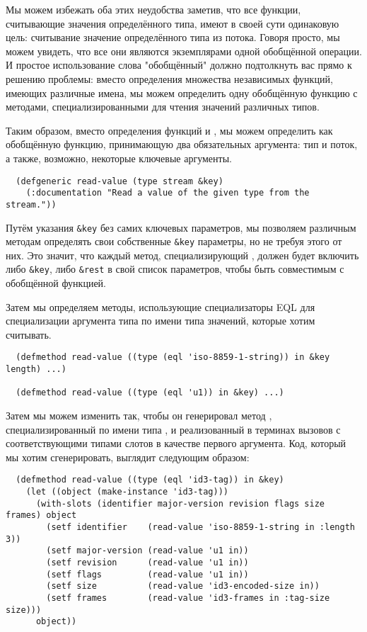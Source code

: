 Мы можем избежать оба этих неудобства заметив, что все функции, считывающие значения
определённого типа, имеют в своей сути одинаковую цель: считывание значение определённого
типа из потока. Говоря просто, мы можем увидеть, что все они являются экземплярами одной
обобщённой операции. И простое использование слова "обобщённый" должно подтолкнуть вас
прямо к решению проблемы: вместо определения множества независимых функций, имеющих
различные имена, мы можем определить одну обобщённую функцию  с методами,
специализированными для чтения значений различных типов.

Таким образом, вместо определения функций  и ,
мы можем определить  как обобщённую функцию, принимающую два обязательных
аргумента: тип и поток, а также, возможно, некоторые ключевые аргументы.

\begin{lstlisting}
  (defgeneric read-value (type stream &key)
    (:documentation "Read a value of the given type from the stream."))
\end{lstlisting}

Путём указания \lstinline!&key! без самих ключевых параметров, мы позволяем различным
методам определять свои собственные \lstinline!&key! параметры, но не требуя этого от
них. Это значит, что каждый метод, специализирующий , должен будет
включить либо \lstinline!&key!, либо \lstinline!&rest! в свой список параметров, чтобы
быть совместимым с обобщённой функцией.

Затем мы определяем методы, использующие специализаторы EQL для специализации аргумента
типа по имени типа значений, которые хотим считывать.

\begin{lstlisting}
  (defmethod read-value ((type (eql 'iso-8859-1-string)) in &key length) ...)

  (defmethod read-value ((type (eql 'u1)) in &key) ...)
\end{lstlisting}

Затем мы можем изменить так, чтобы он генерировал метод
, специализированный по имени типа , и реализованный в
терминах вызовов  с соответствующими типами слотов в качестве первого
аргумента. Код, который мы хотим сгенерировать, выглядит следующим образом:

\begin{lstlisting}
  (defmethod read-value ((type (eql 'id3-tag)) in &key)
    (let ((object (make-instance 'id3-tag)))
      (with-slots (identifier major-version revision flags size frames) object
        (setf identifier    (read-value 'iso-8859-1-string in :length 3))
        (setf major-version (read-value 'u1 in))
        (setf revision      (read-value 'u1 in))
        (setf flags         (read-value 'u1 in))
        (setf size          (read-value 'id3-encoded-size in))
        (setf frames        (read-value 'id3-frames in :tag-size size)))
      object))
\end{lstlisting}


